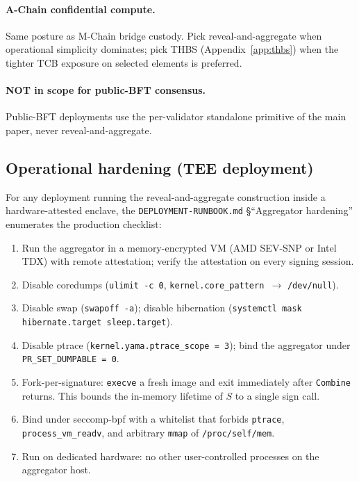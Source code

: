 \paragraph{A-Chain confidential compute.} Same posture as M-Chain
bridge custody. Pick reveal-and-aggregate when operational
simplicity dominates; pick THBS (Appendix~\ref{app:thbs}) when
the tighter TCB exposure on selected elements is preferred.

\paragraph{NOT in scope for public-BFT consensus.} Public-BFT
deployments use the per-validator standalone primitive of the
main paper, never reveal-and-aggregate.

\subsection{Operational hardening (TEE deployment)}
\label{app:reveal:hardening}

For any deployment running the reveal-and-aggregate construction
inside a hardware-attested enclave, the \texttt{DEPLOYMENT-RUNBOOK.md}
\S``Aggregator hardening'' enumerates the production checklist:
\begin{enumerate}[leftmargin=2em,nosep]
  \item Run the aggregator in a memory-encrypted VM (AMD SEV-SNP
        or Intel TDX) with remote attestation; verify the
        attestation on every signing session.
  \item Disable coredumps (\texttt{ulimit -c 0},
        \texttt{kernel.core\_pattern \(\to\)} \texttt{/dev/null}).
  \item Disable swap (\texttt{swapoff -a}); disable hibernation
        (\texttt{systemctl mask hibernate.target sleep.target}).
  \item Disable ptrace
        (\texttt{kernel.yama.ptrace\_scope = 3}); bind the
        aggregator under \texttt{PR\_SET\_DUMPABLE = 0}.
  \item Fork-per-signature: \texttt{execve} a fresh image and exit
        immediately after \texttt{Combine} returns. This bounds
        the in-memory lifetime of $S$ to a single sign call.
  \item Bind under seccomp-bpf with a whitelist that forbids
        \texttt{ptrace}, \texttt{process\_vm\_readv}, and
        arbitrary \texttt{mmap} of \texttt{/proc/self/mem}.
  \item Run on dedicated hardware: no other user-controlled
        processes on the aggregator host.
\end{enumerate}
